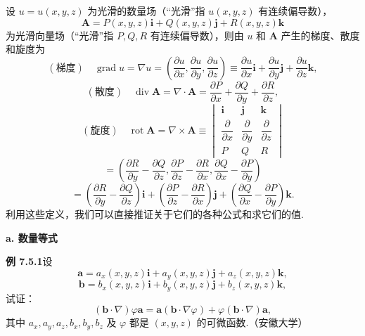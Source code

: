 \documentclass[UTF8, 12pt, fontset=fandol, oneside]{ctexart}
\begin{document}
设 $u=u(x,y,z)$ 为光滑的数量场（“光滑”指 $u(x,y,z)$ 有连续偏导数），
\[
\mathbf A=P(x,y,z)\mathbf i+Q(x,y,z)\mathbf j+R(x,y,z)\mathbf k
\]
为光滑向量场（“光滑”指 $P,Q,R$ 有连续偏导数），则由 $u$ 和 $\mathbf A$ 产生的梯度、散度和旋度为
\[
(\text{梯度})\quad \operatorname{grad}u=\nabla u
=\left(\frac{\partial u}{\partial x},\frac{\partial u}{\partial y},\frac{\partial u}{\partial z}\right)
\equiv\frac{\partial u}{\partial x}\mathbf i+\frac{\partial u}{\partial y}\mathbf j+\frac{\partial u}{\partial z}\mathbf k,
\]
\[
(\text{散度})\quad \operatorname{div}\mathbf A=\nabla\cdot\mathbf A
=\frac{\partial P}{\partial x}+\frac{\partial Q}{\partial y}+\frac{\partial R}{\partial z},
\]
\[
(\text{旋度})\quad \operatorname{rot}\mathbf A=\nabla\times\mathbf A
\equiv
\begin{vmatrix}
\mathbf i & \mathbf j & \mathbf k\\
\dfrac{\partial}{\partial x} & \dfrac{\partial}{\partial y} & \dfrac{\partial}{\partial z}\\
P & Q & R
\end{vmatrix}
\]
\[
=\left(\frac{\partial R}{\partial y}-\frac{\partial Q}{\partial z},\frac{\partial P}{\partial z}-\frac{\partial R}{\partial x},\frac{\partial Q}{\partial x}-\frac{\partial P}{\partial y}\right)
\]
\[
=\left(\frac{\partial R}{\partial y}-\frac{\partial Q}{\partial z}\right)\mathbf i
+\left(\frac{\partial P}{\partial z}-\frac{\partial R}{\partial x}\right)\mathbf j
+\left(\frac{\partial Q}{\partial x}-\frac{\partial P}{\partial y}\right)\mathbf k.
\]
利用这些定义，我们可以直接推证关于它们的各种公式和求它们的值.

\noindent\textbf{a. 数量等式}

\noindent\textbf{例 7.5.1}\quad 设
\[
\mathbf a=a_x(x,y,z)\mathbf i+a_y(x,y,z)\mathbf j+a_z(x,y,z)\mathbf k,
\]
\[
\mathbf b=b_x(x,y,z)\mathbf i+b_y(x,y,z)\mathbf j+b_z(x,y,z)\mathbf k,
\]
试证：
\[
(\mathbf b\cdot\nabla)\varphi\mathbf a=\mathbf a(\mathbf b\cdot\nabla\varphi)+\varphi(\mathbf b\cdot\nabla)\mathbf a,
\]
其中 $a_x,a_y,a_z,b_x,b_y,b_z$ 及 $\varphi$ 都是 $(x,y,z)$ 的可微函数.（安徽大学）
\end{document}
